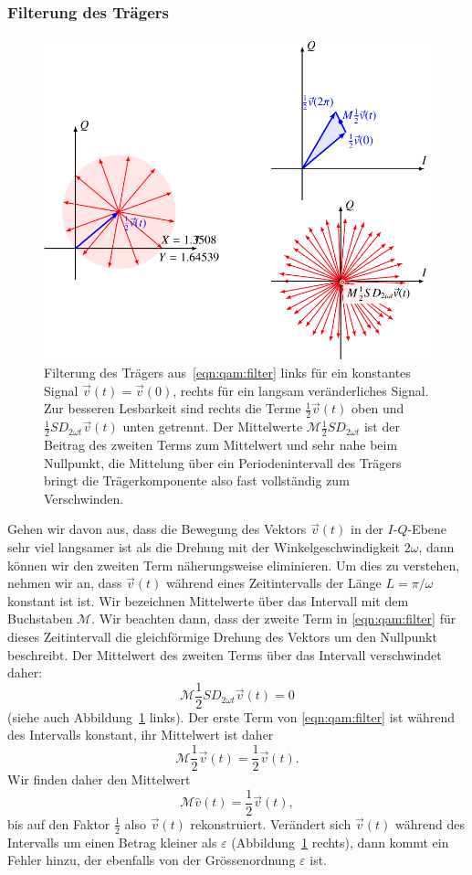 \subsubsection{Filterung des Trägers}
\begin{figure}
\centering
\includegraphics{applications/qam/filter.pdf}
\caption{Filterung des Trägers aus~\eqref{eqn:qam:filter}
links für ein konstantes Signal $\vec{v}(t)=\vec{v}(0)$, rechts
für ein langsam veränderliches Signal.
Zur besseren Lesbarkeit sind rechts die Terme
$\frac12\vec{v}(t)$ oben und $\frac12SD_{2\omega t}\vec{v}(t)$
unten getrennt.
Der Mittelwerte $\mathcal{M}\frac12SD_{2\omega t}$ ist der Beitrag des
zweiten Terms zum Mittelwert und sehr nahe beim Nullpunkt,
die Mittelung über ein Periodenintervall des Trägers bringt die
Trägerkomponente also fast vollständig zum Verschwinden.
\label{figure:qam:filter}}
\end{figure}
Gehen wir davon aus, dass die Bewegung des Vektors $\vec{v}(t)$ in
der $I$-$Q$-Ebene sehr viel langsamer ist als die Drehung mit der
Winkelgeschwindigkeit $2\omega$, dann können wir den zweiten Term
näherungsweise eliminieren.
Um dies zu verstehen, nehmen wir an, dass $\vec{v}(t)$ während eines
Zeitintervalls der Länge $L=\pi/\omega$ konstant ist ist.
Wir bezeichnen Mittelwerte über das Intervall mit dem Buchstaben $\mathcal{M}$.
Wir beachten dann, dass der zweite Term in \eqref{eqn:qam:filter}
für dieses Zeitintervall die gleichförmige Drehung des Vektors
um den Nullpunkt beschreibt.
Der Mittelwert des zweiten Terms über das Intervall verschwindet daher:
\[
\mathcal{M}\frac12SD_{2\omega t}\vec{v}(t)
=
0
\]
(siehe auch Abbildung~\ref{figure:qam:filter} links).
Der erste Term von \eqref{eqn:qam:filter} ist während des Intervalls
konstant, ihr Mittelwert ist daher
\[
\mathcal{M}\frac12\vec{v}(t)
=
\frac12\vec{v}(t).
\]
Wir finden daher den Mittelwert
\[
\mathcal{M}\hat{v}(t)
=
\frac12\vec{v}(t),
\]
bis auf den Faktor $\frac12$ also $\vec{v}(t)$ rekonstruiert.
Verändert sich $\vec{v}(t)$ während des Intervalls um einen Betrag
kleiner als $\varepsilon$ (Abbildung~\ref{figure:qam:filter} rechts),
dann kommt ein Fehler hinzu, der ebenfalls
von der Grössenordnung $\varepsilon$ ist.

